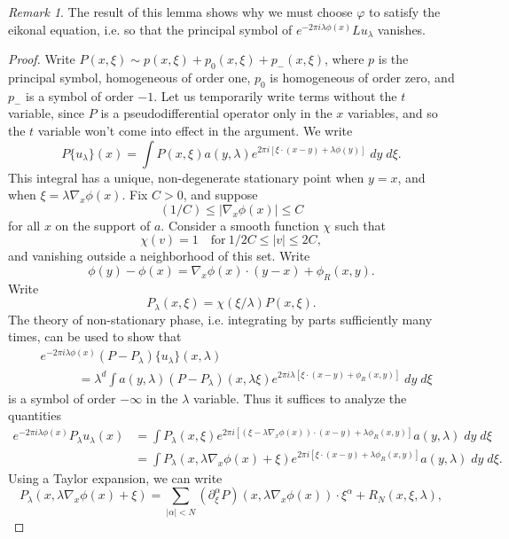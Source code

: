 \documentclass{article}
\theoremstyle{plain}
\theoremstyle{remark}
\newtheorem*{remark}{Remark}
\theoremstyle{definition}
\begin{document}
\begin{remark}
	The result of this lemma shows why we must choose $\varphi$ to satisfy the eikonal equation, i.e. so that the principal symbol of $e^{-2 \pi i \lambda \phi(x)} L u_\lambda$ vanishes.
\end{remark}

\begin{proof}
	Write $P(x,\xi) \sim p(x,\xi) + p_0(x,\xi) + p_-(x,\xi)$, where $p$ is the principal symbol, homogeneous of order one, $p_0$ is homogeneous of order zero, and $p_-$ is a symbol of order $-1$. Let us temporarily write terms without the $t$ variable, since $P$ is a pseudodifferential operator only in the $x$ variables, and so the $t$ variable won't come into effect in the argument. We write
	\[ P \{ u_\lambda \} (x) = \int P(x, \xi) a(y,\lambda) e^{2 \pi i [ \xi \cdot (x - y) + \lambda \phi(y) ]}\; dy\; d\xi. \]
	This integral has a unique, non-degenerate stationary point when $y = x$, and when $\xi = \lambda \nabla_x \phi(x)$. Fix $C > 0$, and suppose
	\[ (1/C) \leq |\nabla_x \phi(x)| \leq C \]
	for all $x$ on the support of $a$. Consider a smooth function $\chi$ such that
	\[ \chi(v) = 1 \quad\text{for}\ 1/2C \leq |v| \leq 2C, \]
	and vanishing outside a neighborhood of this set. Write
	\[ \phi(y) - \phi(x) = \nabla_x \phi(x) \cdot (y - x) + \phi_R(x,y). \]
	Write
	\[ P_\lambda(x,\xi) = \chi(\xi / \lambda) P(x,\xi). \]
	The theory of non-stationary phase, i.e. integrating by parts sufficiently many times, can be used to show that
	\begin{align*}
		& e^{- 2 \pi i \lambda \phi(x) } (P - P_\lambda) \{ u_\lambda \} (x,\lambda)\\
		& \quad\quad\quad = \lambda^d \int a(y,\lambda) (P - P_\lambda)(x,\lambda \xi) e^{2 \pi i \lambda [ \xi \cdot (x - y) + \phi_R(x,y) ]}\; dy\; d\xi
	\end{align*}
	is a symbol of order $-\infty$ in the $\lambda$ variable. Thus it suffices to analyze the quantities
	\begin{align*}
		e^{-2 \pi i \lambda \phi(x)} P_\lambda u_\lambda(x) &= \int P_\lambda(x, \xi) e^{2 \pi i [ (\xi - \lambda \nabla_x \phi(x)) \cdot (x - y) + \lambda \phi_R(x,y) ]} a(y, \lambda)\; dy\; d\xi\\
		&= \int P_\lambda(x, \lambda \nabla_x \phi(x) + \xi) e^{2 \pi i [ \xi \cdot (x - y) + \lambda \phi_R(x,y) ]} a(y,\lambda)\; dy\; d\xi.
	\end{align*}
	Using a Taylor expansion, we can write
	\[ P_\lambda(x, \lambda \nabla_x \phi(x) + \xi) = \sum_{|\alpha| < N} (\partial_\xi^\alpha P)(x, \lambda \nabla_x \phi(x)) \cdot \xi^\alpha + R_N(x,\xi,\lambda), \]

\end{proof}
\end{document}
